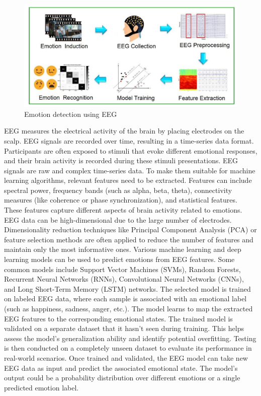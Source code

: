 \documentclass[conference]{IEEEtran}
\begin{document}
\begin{figure}[htbp]
\centerline{\includegraphics[scale=0.07]{EEG.png}} 
\caption{Emotion detection using EEG  \cite{zheng2023two}}
\label{fig}
\end{figure}
\cite{ma2022data}
EEG measures the electrical activity of the brain by placing electrodes on the scalp. EEG signals are recorded over time, resulting in a time-series data format. Participants are often exposed to stimuli that evoke different emotional responses, and their brain activity is recorded during these stimuli presentations. EEG signals are raw and complex time-series data. To make them suitable for machine learning algorithms, relevant features need to be extracted. Features can include spectral power, frequency bands (such as alpha, beta, theta), connectivity measures (like coherence or phase synchronization), and statistical features. These features capture different aspects of brain activity related to emotions. EEG data can be high-dimensional due to the large number of electrodes. Dimensionality reduction techniques like Principal Component Analysis (PCA) or feature selection methods are often applied to reduce the number of features and maintain only the most informative ones. Various machine learning and deep learning models can be used to predict emotions from EEG features. Some common models include Support Vector Machines (SVMs), Random Forests, Recurrent Neural Networks (RNNs), Convolutional Neural Networks (CNNs), and Long Short-Term Memory (LSTM) networks. The selected model is trained on labeled EEG data, where each sample is associated with an emotional label (such as happiness, sadness, anger, etc.). The model learns to map the extracted EEG features to the corresponding emotional states. The trained model is validated on a separate dataset that it hasn't seen during training. This helps assess the model's generalization ability and identify potential overfitting. Testing is then conducted on a completely unseen dataset to evaluate its performance in real-world scenarios. Once trained and validated, the EEG model can take new EEG data as input and predict the associated emotional state. The model's output could be a probability distribution over different emotions or a single predicted emotion label.
\end{document}
